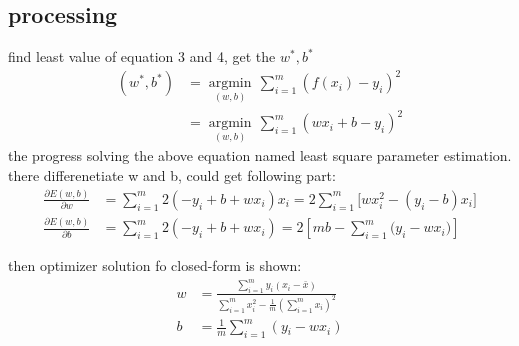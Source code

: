 \documentclass[12pt]{ctexart}%
\begin{document}
	\subsection{\quad processing}
		find least value of equation 3 and 4, get the $w^*,b^*$ 
		\begin{align}
			({{w}^{*}},{{b}^{*}}) & =\underset{(w,b)}{\mathop{\arg \min }}\,\sum\limits_{i=1}^{m}{{{(f({{x}_{i}})-{{y}_{i}})}^{2}}} \\ 
			& =\underset{(w,b)}{\mathop{\arg \min }}\,\sum\limits_{i=1}^{m}{{{(w{{x}_{i}}+b-{{y}_{i}})}^{2}}} 
		\end{align}
		the progress solving the above equation named least square parameter estimation. there differenetiate w and b, could get following part:
		\begin{align}
			\frac{\partial E(w,b)}{\partial w}&=\sum\limits_{i=1}^{m}{2(-{{y}_{i}}+b+w{{x}_{i}}){{x}_{i}}}=2\sum\limits_{i=1}^{m}{[wx_{i}^{2}-({{y}_{i}}-b)}{{x}_{i}}]\\
			\frac{\partial E(w,b)}{\partial b}&=\sum\limits_{i=1}^{m}{2(-{{y}_{i}}+b+w{{x}_{i}})}=2[mb-\sum\limits_{i=1}^{m}{({{y}_{i}}-w{{x}_{i}}})]
		\end{align}

		then optimizer solution fo closed-form is shown:
		\begin{align}
			w&=\frac{\sum\limits_{i=1}^{m}{{{y}_{i}}({{x}_{i}}-\bar{x})}}{\sum\limits_{i=1}^{m}{x_{i}^{2}-\frac{1}{m}{{(\sum\limits_{i=1}^{m}{{{x}_{i}}})}^{2}}}}\\
			b&=\frac{1}{m}\sum\limits_{i=1}^{m}{(y{}_{i}-w{{x}_{i}})}
		\end{align}
\end{document}
